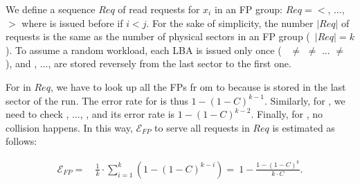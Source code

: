 We define a sequence $Req$ of read requests for $x_i$ in an FP group: $Req =
<$, ..., $>$ where  is issued before  if $i<j$.
For the sake of simplicity, the number $|Req|$ of requests is the same as
the number of physical sectors in an FP group (\ie~$|Req| = k$).  To assume a random
workload, each LBA is issued only once (\ie~ $\neq$ 
$\neq$ ... $\neq$ ), and , ...,  are stored reversely
from the last sector to the first one.

For  in $Req$, we have to look up all the FPs fr
om  to 
because  is stored in the last sector of the run.
The error rate for  is thus $1 - (1 - C)^{k-1}$.
Similarly, for , we need to check , ...,
, and its error rate is $1 - (1 - C)^{k-2}$. Finally,
for , no collision happens. In this way, 
$\mathcal{E}_{FP}$ to serve all requests in $Req$ 
is estimated as follows:

\noindent\small
\begin{align}\label{eq:fpr-relax}
 	\mathcal{E}_{FP}	= \ & \frac{1}{k} \cdot \sum^{k}_{i=1}{(1 - (1 - C)^{k-i})} = \ 1 - \frac{1-(1-C)^{k}}{k \cdot C}.
\end{align}
\normalsize



